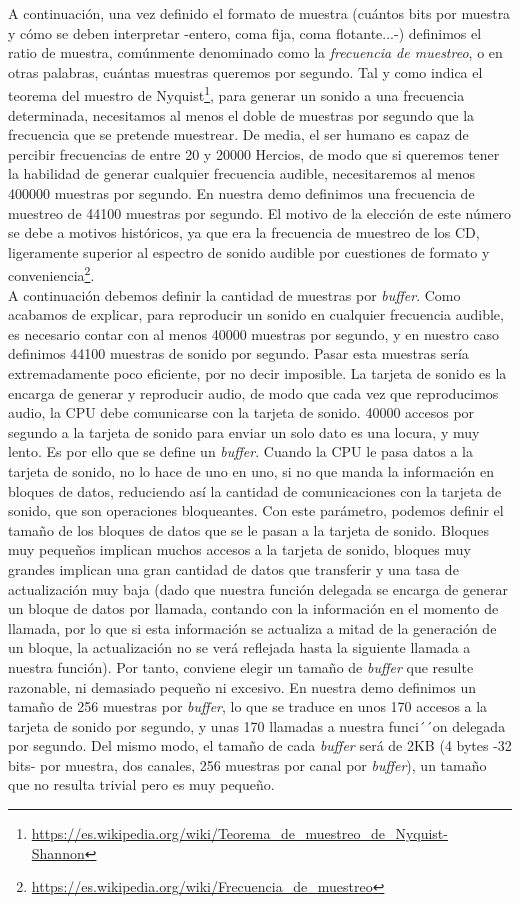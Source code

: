 A continuación, una vez definido el formato de muestra (cuántos bits por muestra y cómo se deben interpretar -entero, coma fija, coma flotante...-) definimos el ratio de muestra, comúnmente denominado como la \emph{frecuencia de muestreo}, o en otras palabras, cuántas muestras queremos por segundo. Tal y como indica el teorema del muestro de Nyquist\footnote{\url{https://es.wikipedia.org/wiki/Teorema_de_muestreo_de_Nyquist-Shannon}}, para generar un sonido a una frecuencia determinada, necesitamos al menos el doble de muestras por segundo que la frecuencia que se pretende muestrear. De media, el ser humano es capaz de percibir frecuencias de entre 20 y 20000 Hercios, de modo que si queremos tener la habilidad de generar cualquier frecuencia audible, necesitaremos al menos 400000 muestras por segundo. En nuestra demo definimos una frecuencia de muestreo de 44100 muestras por segundo. El motivo de la elección de este número se debe a motivos históricos, ya que era la frecuencia de muestreo de los CD, ligeramente superior al espectro de sonido audible por cuestiones de formato y conveniencia\footnote{\url{https://es.wikipedia.org/wiki/Frecuencia_de_muestreo}}.\\

A continuación debemos definir la cantidad de muestras por \emph{buffer}. Como acabamos de explicar, para reproducir un sonido en cualquier frecuencia audible, es necesario contar con al menos 40000 muestras por segundo, y en nuestro caso definimos 44100 muestras de sonido por segundo. Pasar esta muestras sería extremadamente poco eficiente, por no decir imposible. La tarjeta de sonido es la encarga de generar y reproducir audio, de modo que cada vez que reproducimos audio, la CPU debe comunicarse con la tarjeta de sonido. 40000 accesos por segundo a la tarjeta de sonido para enviar un solo dato es una locura, y muy lento. Es por ello que se define un \emph{buffer}. Cuando la CPU le pasa datos a la tarjeta de sonido, no lo hace de uno en uno, si no que manda la información en bloques de datos, reduciendo así la cantidad de comunicaciones con la tarjeta de sonido, que son operaciones bloqueantes. Con este parámetro, podemos definir el tamaño de los bloques de datos que se le pasan a la tarjeta de sonido. Bloques muy pequeños implican muchos accesos a la tarjeta de sonido, bloques muy grandes implican una gran cantidad de datos que transferir y una tasa de actualización muy baja (dado que nuestra función delegada se encarga de generar un bloque de datos por llamada, contando con la información en el momento de llamada, por lo que si esta información se actualiza a mitad de la generación de un bloque, la actualización no se verá reflejada hasta la siguiente llamada a nuestra función). Por tanto, conviene elegir un tamaño de \emph{buffer} que resulte razonable, ni demasiado pequeño ni excesivo. En nuestra demo definimos un tamaño de 256 muestras por \emph{buffer}, lo que se traduce en unos 170 accesos a la tarjeta de sonido por segundo, y unas 170 llamadas a nuestra funci´´on delegada por segundo. Del mismo modo, el tamaño de cada \emph{buffer} será de 2KB (4 bytes -32 bits- por muestra, dos canales, 256 muestras por  canal por \emph{buffer}), un tamaño que no resulta trivial pero es muy pequeño.\\

